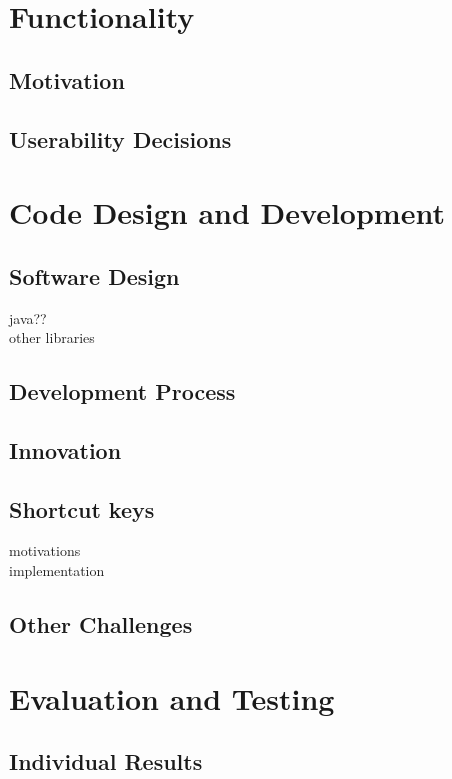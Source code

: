 \documentclass[conference]{IEEEtran}
\begin{document}
\section{Functionality}
	\subsection{Motivation}
	\subsection{Userability Decisions}
	
	\section{Code Design and Development}
	\subsection{Software Design}
	java??\\other libraries\\
	\subsection{Development Process}
	\subsection{Innovation}
	\subsection{Shortcut keys}
	motivations\\implementation\\
	\subsection{Other Challenges}

\section{Evaluation and Testing}
	\subsection{Individual Results}
\end{document}
